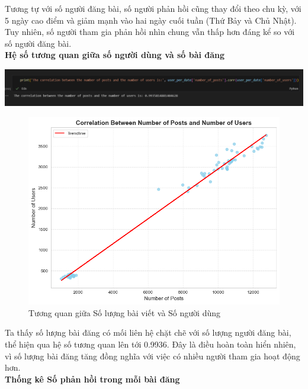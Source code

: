 Tương tự với số người đăng bài, số người phản hồi cũng thay đổi theo chu kỳ, với 5 ngày cao điểm và giảm mạnh vào hai ngày cuối tuần (Thứ Bảy và Chủ Nhật). Tuy nhiên, số người tham gia phản hồi nhìn chung vẫn thấp hơn đáng kể so với số người đăng bài.\\

\textbf{Hệ số tương quan giữa số người dùng và số bài đăng}
\begin{center}
     \includegraphics[width=1\linewidth]{images/C2_pic52.png}
\end{center}
\vspace{-1em}
\begin{figure}[H]
    \centering
    \includegraphics[width=0.55\linewidth]{images/C2_pic50.png}
    \vspace{-1em}
    \caption{Tương quan giữa Số lượng bài viết và Số người dùng}
\end{figure}

Ta thấy số lượng bài đăng có mối liên hệ chặt chẽ với số lượng người đăng bài, thể hiện qua hệ số tương quan lên tới 0.9936. Đây là điều hoàn toàn hiển nhiên, vì số lượng bài đăng tăng đồng nghĩa với việc có nhiều người tham gia hoạt động hơn.\\

\textbf{Thống kê Số phản hồi trong mỗi bài đăng}

